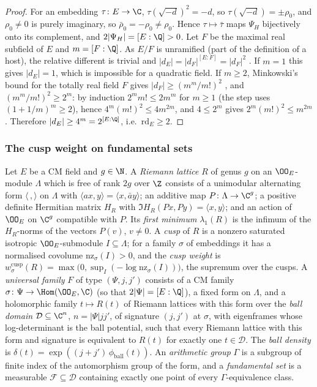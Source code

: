 \begin{proof}
For an embedding $\tau\colon E\to\C$, $\tau(\sqrt{-d})^2=-d$, so $\tau(\sqrt{-d})=\pm\rho_0$, and $\rho_0\ne0$
is purely imaginary, so $\bar\rho_0=-\rho_0\ne\rho_0$. Hence $\tau\mapsto\bar\tau$ maps $\Psi_H$ bijectively
onto its complement, and $2|\Psi_H|=[E:\Q]>0$. Let $F$ be the maximal real subfield of $E$ and $m=[F:\Q]$.
As $E/F$ is unramified (part of the definition of a host), the relative different is trivial and
$|d_E|=|d_F|^{[E:F]}=|d_F|^2$ \cite[Ch.~III, \S2]{Neukirch1999}. If $m=1$ this gives $|d_E|=1$, which is
impossible for a quadratic field. If $m\ge2$, Minkowski's bound for the totally real field $F$ gives
$|d_F|\ge(m^m/m!)^2$ \cite[Ch.~III, \S2]{Neukirch1999}, and $(m^m/m!)^2\ge2^m$: by induction
$2^mm!\le2m^m$ for $m\ge1$ (the step uses $(1+1/m)^m\ge2$), hence $4^m(m!)^2\le4m^{2m}$, and $4\le2^m$
gives $2^m(m!)^2\le m^{2m}$. Therefore $|d_E|\ge4^m=2^{[E:\Q]}$, i.e.\ $\mathrm{rd}_E\ge2$.
\end{proof}

\subsubsection*{The cusp weight on fundamental sets}
Let $E$ be a CM field and $g\in\N$. A \emph{Riemann lattice} $R$ of genus $g$ on an $\OO_E$-module $\Lambda$
which is free of rank $2g$ over $\Z$ consists of a unimodular alternating form $\langle\,,\rangle$ on
$\Lambda$ with $\langle ax,y\rangle=\langle x,\bar ay\rangle$; an additive map $P\colon\Lambda\to\C^g$; a
positive definite Hermitian matrix $H_R$ with $\Im H_R(Px,Py)=\langle x,y\rangle$; and an action of $\OO_E$
on $\C^g$ compatible with $P$. Its \emph{first
minimum} $\lambda_1(R)$ is the infimum of the $H_R$-norms of the vectors $P(v)$, $v\ne0$. A \emph{cusp} of $R$ is
a nonzero saturated isotropic $\OO_E$-submodule $I\subseteq\Lambda$; for a family $\sigma$ of embeddings it
has a normalised covolume $\mathrm{nz}_\sigma(I)>0$, and the \emph{cusp weight} is
$w^{\mathrm{cusp}}_\sigma(R)=\max\bigl(0,\sup_I(-\log\mathrm{nz}_\sigma(I))\bigr)$, the supremum over the
cusps. A \emph{universal family} $F$ of type $(\Psi,j,j')$ consists of a CM family
$\sigma\colon\Psi\to\Hom(\OO_E,\C)$ (so that $2|\Psi|=[E:\Q]$), a fixed form on $\Lambda$, and a holomorphic
 family
$t\mapsto R(t)$ of Riemann lattices with this form over the \emph{ball domain} $\mathcal D\subseteq\C^n$,
$n=|\Psi|jj'$, of signature $(j,j')$ at $\sigma$, with eigenframes whose log-determinant is the ball
potential, such that every Riemann lattice with this form and signature is equivalent to $R(t)$ for exactly
one $t\in\mathcal D$. The \emph{ball density} is $\delta(t)=\exp((j+j')\,\phi_{\mathrm{ball}}(t))$. An
\emph{arithmetic group} $\Gamma$ is a subgroup of finite index of the automorphism group of the form, and a
\emph{fundamental set} is a measurable $\mathcal F\subseteq\mathcal D$ containing exactly one point of every
$\Gamma$-equivalence class.

